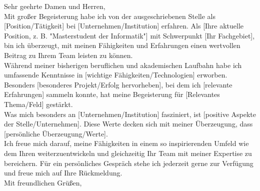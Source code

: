 \documentclass[9pt]{developercv} %
\begin{document}
\begin{minipage}[t]{1\textwidth} %
\vspace{-\baselineskip}

Sehr geehrte Damen und Herren,\\[0.5cm]

Mit großer Begeisterung habe ich von der ausgeschriebenen Stelle als [Position/Tätigkeit] bei [Unternehmen/Institution] erfahren. Als [Ihre aktuelle Position, z. B. "Masterstudent der Informatik"] mit Schwerpunkt [Ihr Fachgebiet], bin ich überzeugt, mit meinen Fähigkeiten und Erfahrungen einen wertvollen Beitrag zu Ihrem Team leisten zu können.\\[0.5cm]

Während meiner bisherigen beruflichen und akademischen Laufbahn habe ich umfassende Kenntnisse in [wichtige Fähigkeiten/Technologien] erworben. Besonders [besonderes Projekt/Erfolg hervorheben], bei dem ich [relevante Erfahrungen] sammeln konnte, hat meine Begeisterung für [Relevantes Thema/Feld] gestärkt.\\[0.5cm]

Was mich besonders an [Unternehmen/Institution] fasziniert, ist [positive Aspekte der Stelle/Unternehmen]. Diese Werte decken sich mit meiner Überzeugung, dass [persönliche Überzeugung/Werte].\\[0.5cm]

Ich freue mich darauf, meine Fähigkeiten in einem so inspirierenden Umfeld wie dem Ihren weiterzuentwickeln und gleichzeitig Ihr Team mit meiner Expertise zu bereichern. Für ein persönliches Gespräch stehe ich jederzeit gerne zur Verfügung und freue mich auf Ihre Rückmeldung.\\[0.5cm]

Mit freundlichen Grüßen,\\[1cm]

\textbf{\firstname \ \lastname}\\
\end{minipage}

\end{document}
